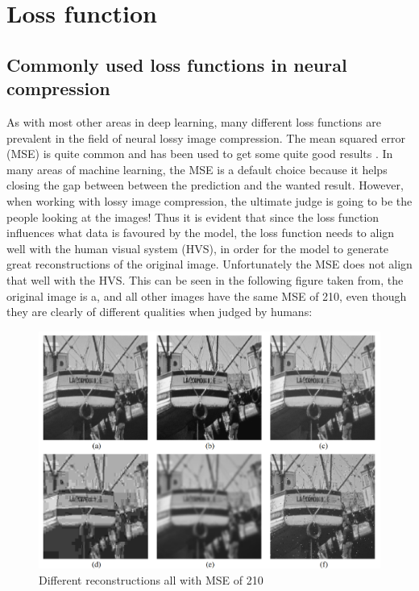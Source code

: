 \section{Loss function}


\subsection{Commonly used loss functions in neural compression}
As with most other areas in deep learning, many different loss functions are prevalent in the field of neural lossy image compression. The mean squared error (MSE) is quite common\cite{benchmark} and has been used to get some quite good results \cite{endToend}. In many areas of machine learning, the MSE is a default choice because it helps closing the gap between between the prediction and the wanted result. However, when working with lossy image compression, the ultimate judge is going to be the people looking at the images! Thus it is evident that since the loss function influences what data is favoured by the model, the loss function needs to align well with the human visual system (HVS), in order for the model to generate great reconstructions of the original image\cite{msebad}\cite{SSIM}. Unfortunately the MSE does not align that well with the HVS\cite{msebad}\cite{SSIM}. This can be seen in the following figure taken from\cite{SSIM}, the original image is a, and all other images have the same MSE of 210, even though they are clearly of different qualities when judged by humans:

\begin{figure}[H]
    \centering
    \includegraphics[width=0.90\linewidth,origin=c]{Report/Pictures/LossFuntion/MSE_SSIM_comparison.png}
    \caption{Different reconstructions all with MSE of 210}
    \label{SSIM MSE comparison}
\end{figure}


